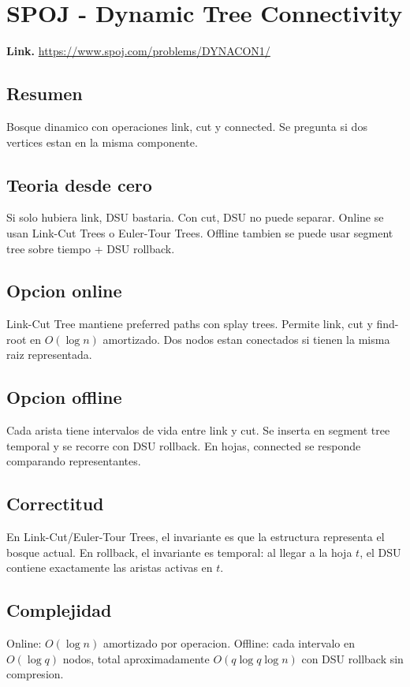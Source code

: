 \documentclass[10pt]{article}
\newcommand{\bigO}{O}
\begin{document}
\clearpage
\section{SPOJ - Dynamic Tree Connectivity}
\textbf{Link.} \url{https://www.spoj.com/problems/DYNACON1/}

\subsection*{Resumen}
Bosque dinamico con operaciones link, cut y connected. Se pregunta si dos
vertices estan en la misma componente.

\subsection*{Teoria desde cero}
Si solo hubiera link, DSU bastaria. Con cut, DSU no puede separar. Online se
usan Link-Cut Trees o Euler-Tour Trees. Offline tambien se puede usar segment
tree sobre tiempo + DSU rollback.

\subsection*{Opcion online}
Link-Cut Tree mantiene preferred paths con splay trees. Permite link, cut y
find-root en $\bigO(\log n)$ amortizado. Dos nodos estan conectados si tienen la
misma raiz representada.

\subsection*{Opcion offline}
Cada arista tiene intervalos de vida entre link y cut. Se inserta en segment
tree temporal y se recorre con DSU rollback. En hojas, connected se responde
comparando representantes.

\subsection*{Correctitud}
En Link-Cut/Euler-Tour Trees, el invariante es que la estructura representa el
bosque actual. En rollback, el invariante es temporal: al llegar a la hoja $t$,
el DSU contiene exactamente las aristas activas en $t$.

\subsection*{Complejidad}
Online: $\bigO(\log n)$ amortizado por operacion. Offline: cada intervalo en
$\bigO(\log q)$ nodos, total aproximadamente $\bigO(q\log q\log n)$ con DSU
rollback sin compresion.
\end{document}
